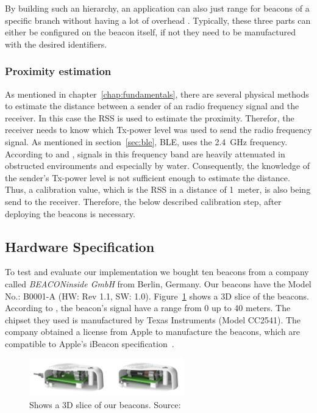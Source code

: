 By building such an hierarchy, an application can also just range for beacons of a specific branch without having a lot of overhead \citep{apple:getting_started,binside:ds}. Typically, these three parts can either be configured on the beacon itself, if not they need to be manufactured with the desired identifiers.

\subsubsection*{Proximity estimation}
As mentioned in chapter~\ref{chap:fundamentals}, there are several physical methods to estimate the distance between a sender of an radio frequency signal and the receiver. In this case the \acl{RSS} is used to estimate the proximity. Therefor, the receiver needs to know which Tx-power level was used to send the radio frequency signal. As mentioned in section~\ref{sec:ble}, \ac{BLE}, uses the 2.4~GHz frequency. According to \citet{apple:getting_started} and \citet{binside:ds}, signals in this frequency band are heavily attenuated in obstructed environments and especially by water. Consequently, the knowledge of the sender's Tx-power level is not sufficient enough to estimate the distance. Thus, a calibration value, which is the \acl{RSS} in a distance of 1~meter, is also being send to the receiver. Therefore, the below described calibration step, after deploying the beacons is necessary.

\subsection{Hardware Specification} To test and evaluate our implementation we bought ten beacons from a company called \emph{BEACONinside GmbH} from Berlin, Germany. Our beacons have the Model No.: B0001-A (HW: Rev 1.1, SW: 1.0). Figure~\ref{fig:bi:beacons} shows a 3D slice of the beacons. According to \citet{binside:ds}, the beacon's signal have a range from 0 up to 40 meters. The chipset they used is manufactured by Texas Instruments (Model CC2541). The company obtained a license from Apple to manufacture the beacons, which are compatible to Apple's iBeacon specification~\citep{binside:ds}.

\begin{figure}
\includegraphics[width=0.6\textwidth]{figures/BEACONinside_beacons}
\caption{Shows a 3D slice of our beacons. Source:~\citep{binside:ds}}
\label{fig:bi:beacons}
\end{figure}

